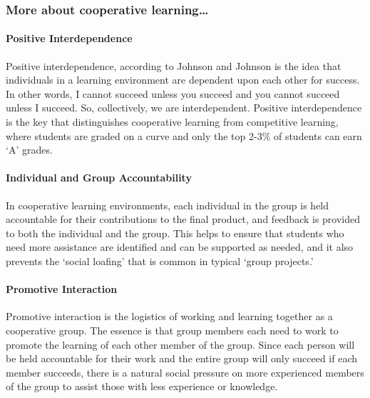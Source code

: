 \documentclass[
]{book}
\begin{document}
\hypertarget{more-about-cooperative-learning}{%
\subsubsection*{More about cooperative learning\ldots{}}\label{more-about-cooperative-learning}}

\hypertarget{positive-interdependence}{%
\paragraph*{Positive Interdependence}\label{positive-interdependence}}

Positive interdependence, according to Johnson and Johnson is the idea that individuals in a learning environment are dependent upon each other for success. In other words, I cannot succeed unless you succeed and you cannot succeed unless I succeed. So, collectively, we are interdependent. Positive interdependence is the key that distinguishes cooperative learning from competitive learning, where students are graded on a curve and only the top 2-3\% of students can earn `A' grades.

\hypertarget{individual-and-group-accountability}{%
\paragraph*{Individual and Group Accountability}\label{individual-and-group-accountability}}

In cooperative learning environments, each individual in the group is held accountable for their contributions to the final product, and feedback is provided to both the individual and the group. This helps to ensure that students who need more assistance are identified and can be supported as needed, and it also prevents the `social loafing' that is common in typical `group projects.'

\hypertarget{promotive-interaction}{%
\paragraph*{Promotive Interaction}\label{promotive-interaction}}

Promotive interaction is the logistics of working and learning together as a cooperative group. The essence is that group members each need to work to promote the learning of each other member of the group. Since each person will be held accountable for their work and the entire group will only succeed if each member succeeds, there is a natural social pressure on more experienced members of the group to assist those with less experience or knowledge.
\end{document}
